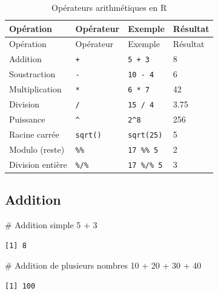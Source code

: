 \documentclass[
  french,
  11pt,
  a4paper,
]{article}
\newenvironment{Shaded}{}{}
\newcommand{\CommentTok}[1]{\textcolor[rgb]{0.42,0.45,0.49}{#1}}
\newcommand{\DecValTok}[1]{\textcolor[rgb]{0.00,0.36,0.77}{#1}}
\newcommand{\SpecialCharTok}[1]{\textcolor[rgb]{0.00,0.36,0.77}{#1}}
\begin{document}
\begin{longtable}[]{@{}llll@{}}
\caption{Opérateurs arithmétiques en R}\tabularnewline
\toprule\noalign{}
Opération & Opérateur & Exemple & Résultat \\
\midrule\noalign{}
\endfirsthead
\toprule\noalign{}
Opération & Opérateur & Exemple & Résultat \\
\midrule\noalign{}
\endhead
\bottomrule\noalign{}
\endlastfoot
Addition & \texttt{+} & \texttt{5\ +\ 3} & 8 \\
Soustraction & \texttt{-} & \texttt{10\ -\ 4} & 6 \\
Multiplication & \texttt{*} & \texttt{6\ *\ 7} & 42 \\
Division & \texttt{/} & \texttt{15\ /\ 4} & 3.75 \\
Puissance & \texttt{\^{}} & \texttt{2\^{}8} & 256 \\
Racine carrée & \texttt{sqrt()} & \texttt{sqrt(25)} & 5 \\
Modulo (reste) & \texttt{\%\%} & \texttt{17\ \%\%\ 5} & 2 \\
Division entière & \texttt{\%/\%} & \texttt{17\ \%/\%\ 5} & 3 \\
\end{longtable}

\subsection{Addition}\label{addition}

\begin{Shaded}
\begin{Highlighting}[]
\CommentTok{\# Addition simple}
\DecValTok{5} \SpecialCharTok{+} \DecValTok{3}
\end{Highlighting}
\end{Shaded}

\begin{verbatim}
[1] 8
\end{verbatim}

\begin{Shaded}
\begin{Highlighting}[]
\CommentTok{\# Addition de plusieurs nombres}
\DecValTok{10} \SpecialCharTok{+} \DecValTok{20} \SpecialCharTok{+} \DecValTok{30} \SpecialCharTok{+} \DecValTok{40}
\end{Highlighting}
\end{Shaded}

\begin{verbatim}
[1] 100
\end{verbatim}
\end{document}

